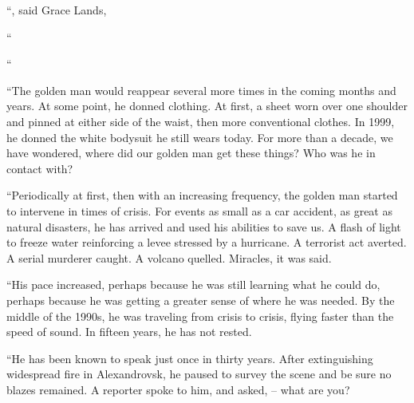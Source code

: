 “, said Grace Lands, 

“

“

“The golden man would reappear several more times in the coming months and years. At some point, he donned clothing. At first, a sheet worn over one shoulder and pinned at either side of the waist, then more conventional clothes. In 1999, he donned the white bodysuit he still wears today. For more than a decade, we have wondered, where did our golden man get these things? Who was he in contact with?

“Periodically at first, then with an increasing frequency, the golden man started to intervene in times of crisis. For events as small as a car accident, as great as natural disasters, he has arrived and used his abilities to save us. A flash of light to freeze water reinforcing a levee stressed by a hurricane. A terrorist act averted. A serial murderer caught. A volcano quelled. Miracles, it was said.

“His pace increased, perhaps because he was still learning what he could do, perhaps because he was getting a greater sense of where he was needed. By the middle of the 1990s, he was traveling from crisis to crisis, flying faster than the speed of sound. In fifteen years, he has not rested.

“He has been known to speak just once in thirty years. After extinguishing widespread fire in Alexandrovsk, he paused to survey the scene and be sure no blazes remained. A reporter spoke to him, and asked,  -- what are you?

